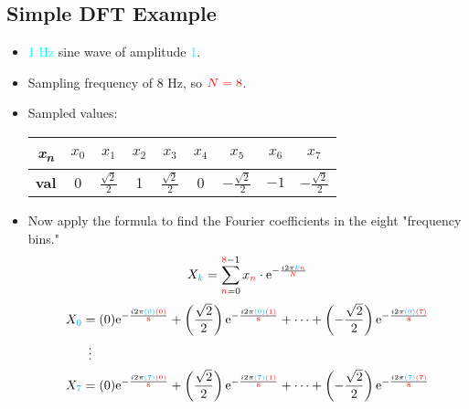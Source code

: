 \documentclass{article}
\begin{document}
\subsection*{Simple DFT Example}
\begin{itemize}
    \item \textcolor{cyan}{1 Hz} sine wave of amplitude \textcolor{cyan}{1}.
    \item Sampling frequency of 8 Hz, so ${\color{red}N=8}$.
    \begin{center}
    \end{center}
    \item Sampled values:
    \begin{table}[h!]
        \centering
        \renewcommand{\arraystretch}{1.4}
        \begin{tabular}{c|cccccccc}
            \textbf{\emph{x}\textsubscript{\emph{n}}} & $x_0$ & $x_1$ & $x_2$ & $x_3$ & $x_4$ & $x_5$ & $x_6$ & $x_7$\\
            \hline
            \textbf{val} & 0 & $\frac{\sqrt{2}}{2}$ & 1 & $\frac{\sqrt{2}}{2}$ & 0 & $-\frac{\sqrt{2}}{2}$ & $-1$ & $-\frac{\sqrt{2}}{2}$\\
        \end{tabular}
    \end{table}
    \item Now apply the formula to find the Fourier coefficients in the eight "frequency bins."
    \begin{equation*}
        X_{\color{cyan}k} = \sum_{{\color{red}n}=0}^{{\color{red}8}-1} x_{\color{red}n}\cdot\e[-\frac{i2\pi {\color{cyan}k}{\color{red}n}}{{\color{red}N}}]
    \end{equation*}
    \begin{align*}
        X_{\color{cyan}0} &= (0)\e[-\frac{i2\pi{\color{cyan}(0)}{\color{red}(0)}}{{\color{red}8}}] + \left( \frac{\sqrt{2}}{2} \right)\e[-\frac{i2\pi{\color{cyan}(0)}{\color{red}(1)}}{{\color{red}8}}] + \cdots + \left( -\frac{\sqrt{2}}{2} \right)\e[-\frac{i2\pi{\color{cyan}(0)}{\color{red}(7)}}{{\color{red}8}}]\\
        &\ \, \vdots\\
        X_{\color{cyan}7} &= (0)\e[-\frac{i2\pi{\color{cyan}(7)}{\color{red}(0)}}{{\color{red}8}}] + \left( \frac{\sqrt{2}}{2} \right)\e[-\frac{i2\pi{\color{cyan}(7)}{\color{red}(1)}}{{\color{red}8}}] + \cdots + \left( -\frac{\sqrt{2}}{2} \right)\e[-\frac{i2\pi{\color{cyan}(7)}{\color{red}(7)}}{{\color{red}8}}]
    \end{align*}
\end{itemize}
\end{document}
